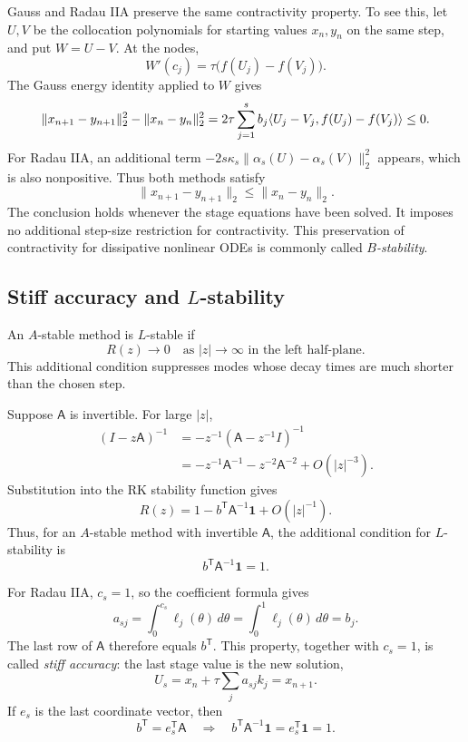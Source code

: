 Gauss and Radau IIA preserve the same contractivity property.
To see this, let \(U,V\) be the collocation polynomials for starting
values \(x_n,y_n\) on the same step, and put \(W=U-V\). At the nodes,
\[
 W'(c_j)=\tau\bigl(f(U_j)-f(V_j)\bigr).
\]
The Gauss energy identity applied to \(W\) gives
\[
 \|x_{n+1}-y_{n+1}\|_2^2-\|x_n-y_n\|_2^2
  =2\tau\sum_{j=1}^s b_j
           \langle U_j-V_j, f(U_j)-f(V_j) \rangle\leq0.
\]
For Radau IIA, an additional term
\(-2s\kappa_s\|\alpha_s(U)-\alpha_s(V)\|_2^2\) appears, which
is also nonpositive. Thus both methods satisfy
\begin{equation}\label{eq:numerical-contractivity-sep-25}
 \boxed{\|x_{n+1}-y_{n+1}\|_2\leq\|x_n-y_n\|_2.}
\end{equation}
The conclusion holds whenever the stage equations have been solved.
It imposes no additional step-size restriction for contractivity.
This preservation of contractivity for dissipative nonlinear ODEs
is commonly called \emph{\(B\)-stability}.

\subsection{Stiff accuracy and \texorpdfstring{\(L\)}{L}-stability}

An \(A\)-stable method is \(L\)-stable if
\[
 R(z)\longrightarrow0
 \quad\text{as }|z|\to\infty\text{ in the left half-plane}.
\]
This additional condition suppresses modes whose decay times are
much shorter than the chosen step.

Suppose \(\mathsf A\) is invertible. For large \(|z|\),
\begin{align*}
 (I-z\mathsf A)^{-1}
  &=-z^{-1}(\mathsf A-z^{-1}I)^{-1}\\
  &=-z^{-1}\mathsf A^{-1}-z^{-2}\mathsf A^{-2}
       +O(|z|^{-3}).
\end{align*}
Substitution into the RK stability function gives
\begin{equation}\label{eq:rk-infinity-limit-sep-25}
 R(z)=1-b^{\mathsf T}\mathsf A^{-1}\mathbf1+O(|z|^{-1}).
\end{equation}
Thus, for an \(A\)-stable method with invertible \(\mathsf A\),
the additional condition for \(L\)-stability is
\begin{equation}\label{eq:l-stability-condition-sep-25}
 b^{\mathsf T}\mathsf A^{-1}\mathbf1=1.
\end{equation}

For Radau IIA, \(c_s=1\), so the coefficient formula gives
\[
 a_{sj}=\int_0^{c_s}\ell_j(\theta)\,d\theta
       =\int_0^1\ell_j(\theta)\,d\theta=b_j.
\]
The last row of \(\mathsf A\) therefore equals \(b^{\mathsf T}\).
This property, together with \(c_s=1\), is called
\emph{stiff accuracy}: the last stage value is the new solution,
\[
 U_s=x_n+\tau\sum_j a_{sj}k_j=x_{n+1}.
\]
If \(e_s\) is the last coordinate vector, then
\[
 b^{\mathsf T}=e_s^{\mathsf T}\mathsf A
 \quad\Longrightarrow\quad
 b^{\mathsf T}\mathsf A^{-1}\mathbf1=e_s^{\mathsf T}\mathbf1=1.
\]

